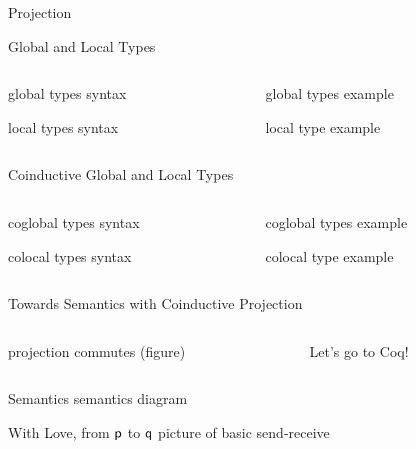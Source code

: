 \documentclass[xcolor={dvipsnames}]{beamer}
\begin{document}
\begin{frame}{Projection}

\end{frame}


\begin{frame}{Global and Local Types}

\begin{columns}
\begin{column}{0.5\textwidth}
  global types syntax


  local types syntax
\end{column}
\begin{column}{0.5\textwidth}  %
  global types example

  local type example
\end{column}
\end{columns}
\end{frame}


\begin{frame}{Coinductive Global and Local Types}
  \begin{columns}
\begin{column}{0.5\textwidth}
  coglobal types syntax


  colocal types syntax
\end{column}
\begin{column}{0.5\textwidth}  %
  coglobal types example

  colocal type example
\end{column}
\end{columns}
\end{frame}

\begin{frame}{Towards Semantics with Coinductive Projection}
  \begin{columns}
\begin{column}{0.5\textwidth}
  projection commutes (figure)
\end{column}
\begin{column}{0.5\textwidth}  %
  Let's go to Coq!
\end{column}
  \end{columns}
\end{frame}

\begin{frame}{Semantics}
  semantics diagram

\end{frame}


\begin{frame}{With Love, from ${\sf p}$ to ${\sf q}$}
picture of basic send-receive
\end{frame}
\end{document}
